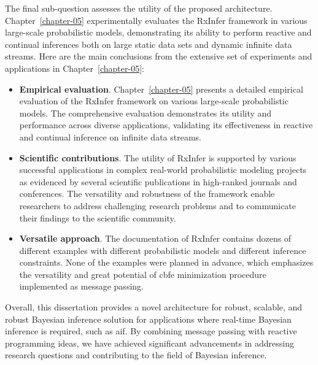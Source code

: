 \begin{questions}[resume] \item \utilityquestion
  \label{question:contributions:utility}
\end{questions}

The final sub-question assesses the utility of the proposed architecture.
Chapter~\ref{chapter-05} experimentally evaluates the RxInfer framework in various
large-scale probabilistic models, demonstrating its ability to perform reactive and continual
inferences both on large static data sets and dynamic infinite data streams.
Here are the main conclusions from the extensive set of experiments and applications in Chapter~\ref{chapter-05}:
\begin{itemize}
  \item \textbf{Empirical evaluation}. Chapter~\ref{chapter-05} presents a detailed empirical 
  evaluation of the RxInfer framework on various large-scale probabilistic models.
        The comprehensive evaluation demonstrates its utility and performance across diverse
        applications, validating its effectiveness in reactive and continual inference on infinite
        data streams.
  \item \textbf{Scientific contributions}.
        The utility of RxInfer is supported by various successful applications in complex
        real-world probabilistic modeling projects as evidenced by several scientific publications in high-ranked
        journals and conferences.
        The versatility and robustness of the framework enable researchers to 
        address challenging research problems and to communicate their findings to the scientific community.
   \item \textbf{Versatile approach}.
        The documentation of RxInfer contains dozens of different examples with different probabilistic models and different inference constraints. None of the examples were planned in advance, which emphasizes the versatility and great potential of \ac{cbfe} minimization procedure implemented as message passing.
\end{itemize}

Overall, this dissertation provides a novel architecture for robust, scalable, and robust Bayesian inference 
solution for applications where real-time Bayesian inference is required, such as \ac{aif}.
By combining message passing with reactive programming ideas, we have achieved significant
advancements in addressing research questions and contributing to the field of Bayesian
inference.

